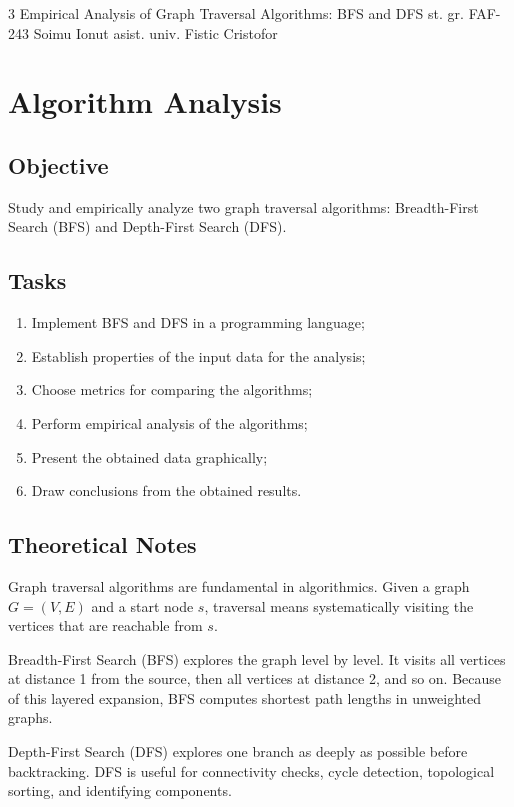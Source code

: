 \documentclass{labreport}
\begin{document}
\labtitle
    {3}
    {Empirical Analysis of Graph Traversal Algorithms: BFS and DFS}
    {st. gr. FAF-243}
    {Soimu Ionut}
    {asist. univ. Fistic Cristofor}

\tableofcontents
\newpage

\lstset{style=python}

\section{Algorithm Analysis}

\subsection{Objective}
Study and empirically analyze two graph traversal algorithms: Breadth-First Search (BFS) and Depth-First Search (DFS).

\subsection{Tasks}
\begin{enumerate}
    \item Implement BFS and DFS in a programming language;
    \item Establish properties of the input data for the analysis;
    \item Choose metrics for comparing the algorithms;
    \item Perform empirical analysis of the algorithms;
    \item Present the obtained data graphically;
    \item Draw conclusions from the obtained results.
\end{enumerate}

\subsection{Theoretical Notes}
Graph traversal algorithms are fundamental in algorithmics. Given a graph $G=(V,E)$ and a start node $s$, traversal means systematically visiting the vertices that are reachable from $s$.

Breadth-First Search (BFS) explores the graph level by level. It visits all vertices at distance 1 from the source, then all vertices at distance 2, and so on. Because of this layered expansion, BFS computes shortest path lengths in unweighted graphs.

Depth-First Search (DFS) explores one branch as deeply as possible before backtracking. DFS is useful for connectivity checks, cycle detection, topological sorting, and identifying components.
\end{document}
